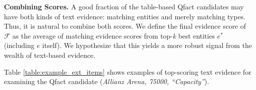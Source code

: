 \vspace{0.1cm}
\noindent \textbf{Combining Scores.}
A good fraction of the table-based Qfact candidates may have both kinds of text evidence: matching entities and
merely matching types.
Thus, it is natural to combine both scores.
We define the final evidence score of $\mathcal{F}$ as the average of matching evidence scores from top-\textit{k} best entities $e^*$ (including $e$ itself).
We hypothesize that this yields a more robust signal
from the wealth of text-based evidence.

Table \ref{table:example_ext_items} shows examples of top-scoring text evidence  for examining 
the Qfact candidate (\textit{Allianz Arena, 75000, ``Capacity''}).

